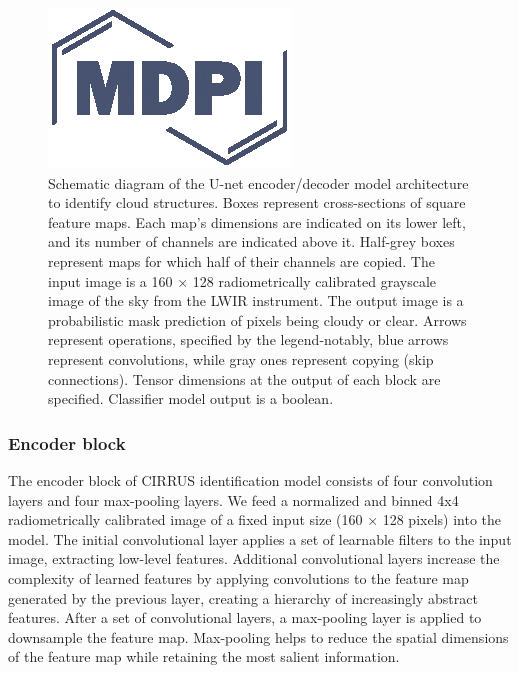 \documentclass[remotesensing,article,submit,pdftex,moreauthors]{Definitions/mdpi}
\begin{document}
\begin{figure}[H]
	\includegraphics[width=10.5 cm]{Definitions/logo-mdpi}
	\caption{
		Schematic diagram of the U-net encoder/decoder model architecture to identify cloud structures. Boxes represent cross-sections of square feature maps. Each map's dimensions are indicated on its lower left, and its number of channels are indicated above it. Half-grey boxes represent maps for which half of their channels are copied. The input image is a 160 × 128 radiometrically calibrated grayscale image of the sky from the LWIR instrument. The output image is a probabilistic mask prediction of pixels being cloudy or clear. Arrows represent operations, specified by the legend-notably, blue arrows represent convolutions, while gray ones represent copying (skip connections). 	Tensor dimensions at the output of each block are specified. Classifier model output is a boolean. \label{fig1}}
	\end{figure}
	\unskip

\subsubsection{Encoder block}

The encoder block of CIRRUS identification model consists of four convolution layers and four max-pooling layers. We feed a normalized and binned 4x4 radiometrically calibrated image of a fixed input size (160 × 128 pixels) into the model.
The initial convolutional layer applies a set of learnable filters to the input image, extracting low-level features. Additional convolutional layers increase the complexity of learned features by applying convolutions to the feature map generated by the previous layer, creating a hierarchy of increasingly abstract features. After a set of convolutional layers, a max-pooling layer is applied to downsample the feature map. Max-pooling helps to reduce the spatial dimensions of the feature map while retaining the most salient information.
\end{document}
